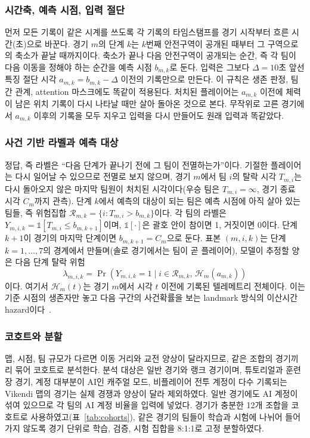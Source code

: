 \subsubsection{시간축, 예측 시점, 입력 절단}
먼저 모든 기록이 같은 시계를 쓰도록 각 기록의 타임스탬프를 경기 시작부터 흐른 시간(초)으로 바꾼다.
경기 $m$의 단계 $k$는 $k$번째 안전구역이 공개된 때부터 그 구역으로의 축소가 끝날 때까지이다.
축소가 끝나 다음 안전구역이 공개되는 순간, 즉 각 팀이 다음 이동을 정해야 하는 순간을 예측 시점 $b_{m,k}$로 둔다.
입력은 그보다 $\Delta=10$초 앞선 특징 절단 시각 $a_{m,k}=b_{m,k}-\Delta$ 이전의 기록만으로 만든다.
이 규칙은 생존 판정, 팀 간 관계, attention 마스크에도 똑같이 적용된다.
처치된 플레이어는 $a_{m,k}$ 이전에 체력이 남은 위치 기록이 다시 나타날 때만 살아 돌아온 것으로 본다.
무작위로 고른 경기에서 $a_{m,k}$ 이후의 기록을 모두 지우고 입력을 다시 만들어도 원래 입력과 똑같았다.

\subsubsection{사건 기반 라벨과 예측 대상}
정답, 즉 라벨은 “다음 단계가 끝나기 전에 그 팀이 전멸하는가”이다.
기절한 플레이어는 다시 일어날 수 있으므로 전멸로 보지 않으며, 경기 $m$에서 팀 $i$의 탈락 시각 $T_{m,i}$는 다시 돌아오지 않은 마지막 팀원이 처치된 시각이다(우승 팀은 $T_{m,i}=\infty$, 경기 종료 시각 $C_m$까지 관측).
단계 $k$에서 예측의 대상이 되는 팀은 예측 시점에 아직 살아 있는 팀들, 즉 위험집합 $\mathcal{R}_{m,k}=\{i: T_{m,i}>b_{m,k}\}$이다.
각 팀의 라벨은 $Y_{m,i,k}=\mathbb{1}[T_{m,i}\le b_{m,k+1}]$이며, $\mathbb{1}[\cdot]$은 괄호 안이 참이면 1, 거짓이면 0이다. 단계 $k+1$이 경기의 마지막 단계이면 $b_{m,k+1}=C_m$으로 둔다.
표본 $(m,i,k)$는 단계 $k=1,\dots,7$의 경계에서 만들며(솔로 경기에서는 팀이 곧 플레이어), 모델이 추정할 양은 다음 단계 탈락 위험
\begin{equation}
\lambda_{m,i,k}=\Pr\!\left(Y_{m,i,k}=1 \mid i\in\mathcal{R}_{m,k},\,\mathcal{H}_{m}(a_{m,k})\right)
\label{eq:hazard}
\end{equation}
이다. 여기서 $\mathcal{H}_{m}(t)$는 경기 $m$에서 시각 $t$ 이전에 기록된 텔레메트리 전체이다.
이는 기준 시점의 생존자만 놓고 다음 구간의 사건확률을 보는 landmark 방식의 이산시간 hazard이다~\cite{SingerWillett93,vanHouwelingen07}.

\subsubsection{코호트와 분할}
\label{sec:method:cohort}
맵, 시점, 팀 규모가 다르면 이동 거리와 교전 양상이 달라지므로, 같은 조합의 경기끼리 묶어 코호트로 분석한다.
분석 대상은 일반 경기와 랭크 경기이며, 튜토리얼과 훈련장 경기, 계정 대부분이 AI인 캐주얼 모드, 비플레이어 전투 계정이 다수 기록되는 Vikendi 맵의 경기는 실제 경쟁과 양상이 달라 제외하였다.
일반 경기에도 AI 계정이 섞여 있으므로 각 팀의 AI 계정 비율을 입력에 넣었다.
경기가 충분한 12개 조합을 코호트로 사용하였고(표~\ref{tab:cohorts}), 같은 경기의 팀들이 학습과 시험에 나뉘어 들어가지 않도록 경기 단위로 학습, 검증, 시험 집합을 8:1:1로 고정 분할하였다.

